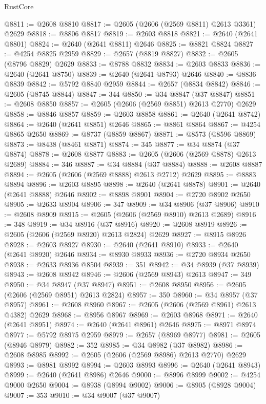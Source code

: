 \begin{lexlean}{RustCore}
\begin{coremodule}
@8811 := @2608 @8810
@8817 := @2605 (@2606 (@2569 @8811) @2613 @3361) @2629
@8818 := @8806 @8817
@8819 := @2603 @8818
@8821 := @2640 (@2641 @8801)
@8824 := @2640 (@2641 @8811) @2646
@8825 := @8821 @8824
@8827 := @4254 @8825 @2959
@8829 := @2657 (@8819 @8827)
@8832 := @2605 (@8796 @8829) @2629
@8833 := @8788 @8832
@8834 := @2603 @8833
@8836 := @2640 (@2641 @8750)
@8839 := @2640 (@2641 @8793) @2646
@8840 := @8836 @8839
@8842 := @5792 @8840 @2959
@8844 := @2657 (@8834 @8842)
@8846 := @2605 (@8745 @8844)
@8847 := 344
@8850 := @34 @8847 (@37 @8847)
@8851 := @2608 @8850
@8857 := @2605 (@2606 (@2569 @8851) @2613 @2770) @2629
@8858 := @8846 @8857
@8859 := @2603 @8858
@8861 := @2640 (@2641 @8742)
@8864 := @2640 (@2641 @8851) @2646
@8865 := @8861 @8864
@8867 := @4254 @8865 @2650
@8869 := @8737 (@8859 @8867)
@8871 := @8573 (@8596 @8869)
@8873 := @8438 (@8461 @8871)
@8874 := 345
@8877 := @34 @8874 (@37 @8874)
@8878 := @2608 @8877
@8883 := @2605 (@2606 (@2569 @8878) @2613 @2689)
@8884 := 346
@8887 := @34 @8884 (@37 @8884)
@8888 := @2608 @8887
@8894 := @2605 (@2606 (@2569 @8888) @2613 @2712) @2629
@8895 := @8883 @8894
@8896 := @2603 @8895
@8898 := @2640 (@2641 @8878)
@8901 := @2640 (@2641 @8888) @2646
@8902 := @8898 @8901
@8904 := @2720 @8902 @2650
@8905 := @2633 @8904
@8906 := 347
@8909 := @34 @8906 (@37 @8906)
@8910 := @2608 @8909
@8915 := @2605 (@2606 (@2569 @8910) @2613 @2689)
@8916 := 348
@8919 := @34 @8916 (@37 @8916)
@8920 := @2608 @8919
@8926 := @2605 (@2606 (@2569 @8920) @2613 @2824) @2629
@8927 := @8915 @8926
@8928 := @2603 @8927
@8930 := @2640 (@2641 @8910)
@8933 := @2640 (@2641 @8920) @2646
@8934 := @8930 @8933
@8936 := @2720 @8934 @2650
@8938 := @2633 @8936 @8504
@8939 := 351
@8942 := @34 @8939 (@37 @8939)
@8943 := @2608 @8942
@8946 := @2606 (@2569 @8943) @2613
@8947 := 349
@8950 := @34 @8947 (@37 @8947)
@8951 := @2608 @8950
@8956 := @2605 (@2606 (@2569 @8951) @2613 @2824)
@8957 := 350
@8960 := @34 @8957 (@37 @8957)
@8961 := @2608 @8960
@8967 := @2605 (@2606 (@2569 @8961) @2613 @4382) @2629
@8968 := @8956 @8967
@8969 := @2603 @8968
@8971 := @2640 (@2641 @8951)
@8974 := @2640 (@2641 @8961) @2646
@8975 := @8971 @8974
@8977 := @5792 @8975 @2959
@8979 := @2657 (@8969 @8977)
@8981 := @2605 (@8946 @8979)
@8982 := 352
@8985 := @34 @8982 (@37 @8982)
@8986 := @2608 @8985
@8992 := @2605 (@2606 (@2569 @8986) @2613 @2770) @2629
@8993 := @8981 @8992
@8994 := @2603 @8993
@8996 := @2640 (@2641 @8943)
@8999 := @2640 (@2641 @8986) @2646
@9000 := @8996 @8999
@9002 := @4254 @9000 @2650
@9004 := @8938 (@8994 @9002)
@9006 := @8905 (@8928 @9004)
@9007 := 353
@9010 := @34 @9007 (@37 @9007)

\end{coremodule}
\end{lexlean}
